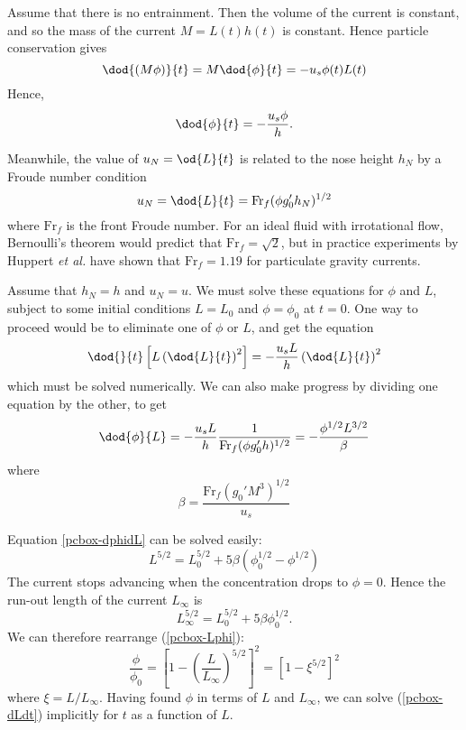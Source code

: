 Assume that there is no entrainment. Then the volume of the current is constant, and so the mass of the current $M = L(t)h(t)$ is constant. Hence particle conservation gives
\begin{equation}
\dod{(M\phi)}{t} = M\dod{\phi}{t} = -u_s \phi(t) L(t)
\end{equation}
Hence,
\begin{equation}
\dod{\phi}{t} = -\frac{u_s \phi}{h}.
\end{equation}

Meanwhile, the value of $u_N = \od{L}{t}$ is related to the nose height $h_N$ by a Froude number condition
\begin{equation}
u_N = \dod{L}{t} = \mathrm{Fr}_f (\phi g_0' h_N)^{1/2} 
 \label{pcbox-dLdt}
\end{equation}
where $\mathrm{Fr}_f$ is the front Froude number. For an ideal fluid with irrotational flow, Bernoulli's theorem would predict that $\mathrm{Fr}_f = \sqrt{2}$, but in practice experiments by Huppert \textit{et al.} have shown that $\mathrm{Fr}_f = 1.19$ for particulate gravity currents. 

Assume that $h_N = h$ and $u_N = u$. We must solve these equations for $\phi$ and $L$, subject to some initial conditions $L=L_0$ and $\phi=\phi_0$ at $t=0$. One way to proceed would be to eliminate one of $\phi$ or $L$, and get the equation
\begin{equation}
 \dod{}{t}\left[ L\left( \dod{L}{t}\right)^2 \right] = -\frac{u_s L}{h} \left(\dod{L}{t}\right)^2
\end{equation}
which must be solved numerically. We can also make progress by dividing one equation by the other, to get
\begin{equation}
\dod{\phi}{L} = -\frac{u_s L}{h} \frac{1}{\mathrm{Fr}_f (\phi g_0' h)^{1/2}} = -\frac{\phi^{1/2} L^{3/2}}{\beta} 
 \label{pcbox-dphidL}
\end{equation}
where
\begin{equation}
\beta = \frac{\mathrm{Fr}_f (g_0' M^3)^{1/2}}{u_s}
\end{equation}

Equation \ref{pcbox-dphidL} can be solved easily:
\begin{equation}
 L^{5/2} =  L_0^{5/2} + 5\beta \left(\phi_0^{1/2} - \phi^{1/2} \right) 
 \label{pcbox-Lphi}
\end{equation}
The current stops advancing when the concentration drops to $\phi = 0$. Hence the run-out length of the current $L_\infty$ is
\begin{equation}
 L_\infty^{5/2} =  L_0^{5/2} + 5\beta \phi_0^{1/2}.
\end{equation}
We can therefore rearrange (\ref{pcbox-Lphi}):
\begin{equation}
 \frac{\phi}{\phi_0} = \left[ 1-\left(\frac{L}{L_\infty}\right)^{5/2} \right]^2 = \left[ 1 - \xi^{5/2} \right]^2
\end{equation}
where $\xi = L/L_\infty$. 
Having found $\phi$ in terms of $L$ and $L_\infty$, we can solve (\ref{pcbox-dLdt}) implicitly for $t$ as a function of $L$. 

